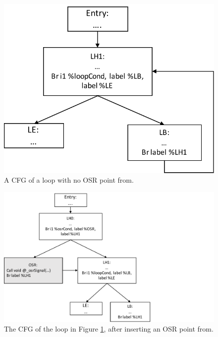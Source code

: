 \begin{figure}[h]
\centering
\includegraphics[scale=0.5]{Figures/BaseCFG}
\decoRule
\caption[A CFG of a loop with no OSR point]{A CFG of a loop with no OSR point from\cite{lameed2013modular}.}
\label{BaseCFG}
\end{figure}

\begin{figure}[h]
\centering
\includegraphics[scale=0.5]{Figures/InsertCFG}
\decoRule
\caption[The CFG of the loop in Figure \ref{BaseCFG}, after inserting an OSR point]{The CFG of the loop in Figure \ref{BaseCFG}, after inserting an OSR point from\cite{lameed2013modular}.}
\label{InsertCFG}
\end{figure}

